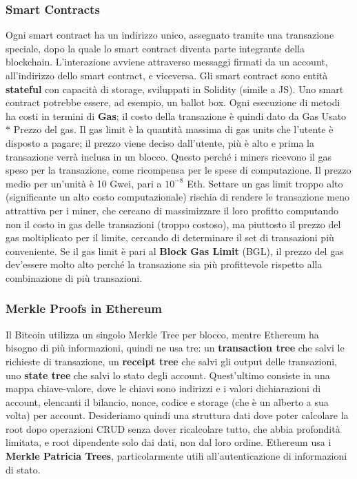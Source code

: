 \documentclass[11pt]{article}
\begin{document}
\subsubsection{Smart Contracts} Ogni smart contract ha un indirizzo unico, assegnato tramite una transazione speciale, dopo la quale lo smart contract diventa parte integrante della blockchain. L'interazione avviene attraverso messaggi firmati da un account, all'indirizzo dello smart contract, e viceversa. Gli smart contract sono entità \textbf{stateful} con capacità di storage, sviluppati in Solidity (simile a JS). Uno smart contract potrebbe essere, ad esempio, un ballot box. Ogni esecuzione di metodi ha costi in termini di \textbf{Gas}; il costo della transazione è quindi dato da Gas Usato $*$ Prezzo del gas. Il gas limit è la quantità massima di gas units che l'utente è disposto a pagare; il prezzo viene deciso dall'utente, più è alto e prima la transazione verrà inclusa in un blocco. Questo perché i miners ricevono il gas speso per la transazione, come ricompensa per le spese di computazione. Il prezzo medio per un'unità è 10 Gwei, pari a $10^{-8}$ Eth. Settare un gas limit troppo alto (significante un alto costo computazionale) rischia di rendere le transazione meno attrattiva per i miner, che cercano di massimizzare il loro profitto computando non il costo in gas delle transazioni (troppo costoso), ma piuttosto il prezzo del gas moltiplicato per il limite, cercando di determinare il set di transazioni più conveniente. Se il gas limit è pari al \textbf{Block Gas Limit} (BGL), il prezzo del gas dev'essere molto alto perché la transazione sia più profittevole rispetto alla combinazione di più transazioni. 
\subsubsection{Merkle Proofs in Ethereum} Il Bitcoin utilizza un singolo Merkle Tree per blocco, mentre Ethereum ha bisogno di più informazioni, quindi ne usa tre: un \textbf{transaction tree} che salvi le richieste di transazione, un \textbf{receipt tree} che salvi gli output delle transazioni, uno \textbf{state tree} che salvi lo stato degli account. Quest'ultimo consiste in una mappa chiave-valore, dove le chiavi sono indirizzi e i valori dichiarazioni di account, elencanti il bilancio, nonce, codice e storage (che è un alberto a sua volta) per account. Desideriamo quindi una struttura dati dove poter calcolare la root dopo operazioni CRUD senza dover ricalcolare tutto, che abbia profondità limitata, e root dipendente solo dai dati, non dal loro ordine. Ethereum usa i \textbf{Merkle Patricia Trees}, particolarmente utili all'autenticazione di informazioni di stato. 
\end{document}
